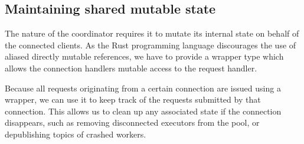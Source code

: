 \subsection{Maintaining shared mutable state}

The nature of the coordinator requires it to mutate its internal state on
behalf of the connected clients. As the Rust programming language discourages
the use of aliased directly mutable references, we have to provide a wrapper
type which allows the connection handlers mutable access to the request handler.

Because all requests originating from a certain connection are issued using a
wrapper, we can use it to keep track of the requests submitted by that connection.
This allows us to clean up any associated state if the connection disappears,
such as removing disconnected executors from the pool, or depublishing 
topics of crashed workers.

